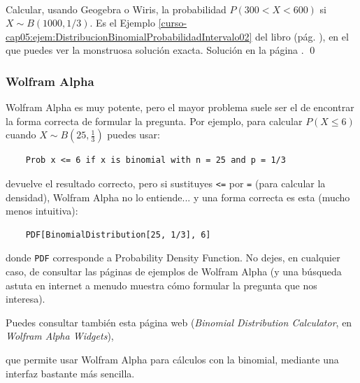 \documentclass[10pt,a4paper]{article}\usepackage[]{graphicx}\usepackage[]{color}
\newcounter{cont01}
\begin{document}
\begin{ejercicio}
\label{tut05:ejercicio09}
\quad\\
Calcular, usando Geogebra o Wiris, la probabilidad $P(300<X<600)$ si $X\sim B(1000, 1/3)$. Es el Ejemplo \ref{curso-cap05:ejem:DistribucionBinomialProbabilidadIntervalo02} del libro (pág. \pageref{curso-cap05:ejem:DistribucionBinomialProbabilidadIntervalo02}), en el que puedes ver la monstruosa solución exacta. Solución en la página \pageref{tut05:ejercicio09:sol}.
\qed
\end{ejercicio}



\subsubsection*{Wolfram Alpha}

Wolfram Alpha es muy potente, pero el mayor problema suele ser el de encontrar la forma correcta de formular la pregunta. Por ejemplo, para calcular $P(X\leq 6)$ cuando $X\sim B(25, \frac{1}{3})$ puedes usar:
    \begin{center}
    \begin{minipage}{10cm}
    \begin{verbatim}
    Prob x <= 6 if x is binomial with n = 25 and p = 1/3
    \end{verbatim}
    \end{minipage}
    \end{center}
devuelve el resultado correcto, pero si sustituyes {\tt <=} por {\tt =} (para calcular la densidad), Wolfram Alpha no lo entiende... y una forma correcta es esta (mucho menos intuitiva):
    \begin{center}
    \begin{minipage}{10cm}
    \begin{verbatim}
    PDF[BinomialDistribution[25, 1/3], 6]
    \end{verbatim}
    \end{minipage}
    \end{center}
donde {\tt PDF} corresponde a Probability Density Function. No dejes, en cualquier caso, de consultar las páginas de ejemplos de Wolfram Alpha (y una búsqueda astuta en internet a menudo muestra cómo formular la pregunta que nos interesa).

Puedes consultar también esta página web ({\em Binomial Distribution Calculator}, en {\em Wolfram Alpha Widgets}),
\begin{center}
\end{center}
que permite usar Wolfram Alpha para cálculos con la binomial, mediante una interfaz bastante más sencilla.
\end{document}

